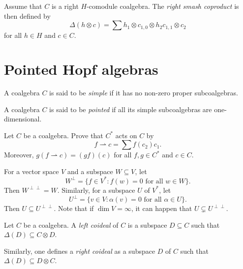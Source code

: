 \documentclass[12pt]{amsproc}
\begin{document}
Assume that $C$ is a right $H$-comodule coalgebra. The \emph{right
smash coproduct} is then defined by 
\[
\Delta(h\otimes c)=\sum h_{1}\otimes c_{1,0}\otimes h_{2}c_{1,1}\otimes c_{2}
\]
for all $h\in H$ and $c\in C$.

\section{Pointed Hopf algebras}


\begin{definition}
    A coalgebra $C$ is said to be \emph{simple} if it has no
    non-zero proper subcoalgebras. 
\end{definition}

\begin{definition}
    A coalgebra $C$ is said to be \emph{pointed} if all its 
    simple subcoalgebras are one-dimensional. 
\end{definition}

\begin{exercise}
\label{xca:Cdual_on_C}
    Let $C$ be a coalgebra. Prove that 
    $C^*$ acts on $C$ by
    \[
    f\rightharpoonup c=\sum f(c_2)c_1.
    \]
    Moreover, $g(f\rightharpoonup c)=(gf)(c)$ for 
    all $f,g\in C^*$ and $c\in C$. 
\end{exercise}

For a vector space $V$ and a subspace $W\subseteq V$, let 
\[
W^\perp=\{f\in V^*:f(w)=0\text{ for all $w\in W$}\}.
\]
Then $W^{\perp\perp}=W$. 
Similarly, for a subspace $U$ of $V^*$, let 
\[
U^\perp=\{v\in V:\alpha(v)=0\text{ for all $\alpha\in U$}\}.
\]
Then $U\subseteq U^{\perp\perp}$. Note that
if $\dim V=\infty$, it can happen that $U\subsetneq U^{\perp\perp}$. 

\begin{definition}
    Let $C$ be a coalgebra. A \emph{left coideal} of $C$ 
    is a subspace $D\subseteq C$ such that 
    $\Delta(D)\subseteq C\otimes D$. 
\end{definition}

Similarly, one defines a \emph{right coideal} as a subspace
$D$ of $C$ such that $\Delta(D)\subseteq D\otimes C$. 
\end{document}
